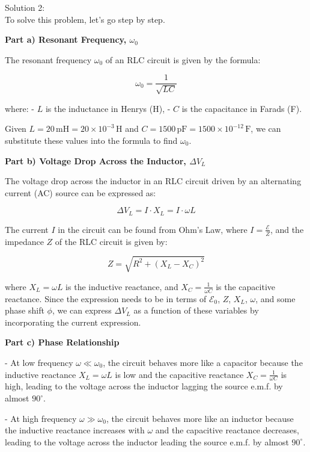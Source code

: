 \documentclass[a4paper,11pt]{article}
\begin{document}
\noindent Solution 2: \\

To solve this problem, let's go step by step.

\textbf{Part a) Resonant Frequency, \( \omega_{0} \)}

The resonant frequency \(\omega_{0}\) of an RLC circuit is given by the formula:

\[
\omega_{0} = \frac{1}{\sqrt{LC}}
\]

where:
- \(L\) is the inductance in Henrys (H),
- \(C\) is the capacitance in Farads (F).

Given \(L = 20 \, \text{mH} = 20 \times 10^{-3} \, \text{H}\) and \(C = 1500 \, \text{pF} = 1500 \times 10^{-12} \, \text{F}\), we can substitute these values into the formula to find \(\omega_{0}\).

\textbf{Part b) Voltage Drop Across the Inductor, \( \Delta V_{L} \)}

The voltage drop across the inductor in an RLC circuit driven by an alternating current (AC) source can be expressed as:

\[
\Delta V_{L} = I \cdot X_{L} = I \cdot \omega L
\]

The current \(I\) in the circuit can be found from Ohm's Law, where \(I = \frac{\mathcal{E}}{Z}\), and the impedance \(Z\) of the RLC circuit is given by:

\[
Z = \sqrt{R^2 + (X_{L} - X_{C})^2}
\]

where \(X_{L} = \omega L\) is the inductive reactance, and \(X_{C} = \frac{1}{\omega C}\) is the capacitive reactance. Since the expression needs to be in terms of \(\mathcal{E}_{0}\), \(Z\), \(X_{L}\), \(\omega\), and some phase shift \(\phi\), we can express \(\Delta V_{L}\) as a function of these variables by incorporating the current expression.

\textbf{Part c) Phase Relationship}

- At low frequency \(\omega \ll \omega_{0}\), the circuit behaves more like a capacitor because the inductive reactance \(X_{L} = \omega L\) is low and the capacitive reactance \(X_{C} = \frac{1}{\omega C}\) is high, leading to the voltage across the inductor lagging the source e.m.f. by almost \(90^\circ\).

- At high frequency \(\omega \gg \omega_{0}\), the circuit behaves more like an inductor because the inductive reactance increases with \(\omega\) and the capacitive reactance decreases, leading to the voltage across the inductor leading the source e.m.f. by almost \(90^\circ\).
\end{document}
